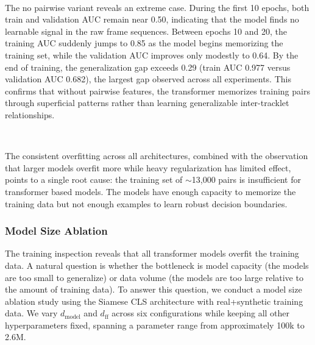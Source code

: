 \

The no pairwise variant reveals an extreme case. During the first 10 epochs, both train and validation AUC remain near 0.50, indicating that the model finds no learnable signal in the raw frame sequences. Between epochs 10 and 20, the training AUC suddenly jumps to 0.85 as the model begins memorizing the training set, while the validation AUC improves only modestly to 0.64. By the end of training, the generalization gap exceeds 0.29 (train AUC 0.977 versus validation AUC 0.682), the largest gap observed across all experiments. This confirms that without pairwise features, the transformer memorizes training pairs through superficial patterns rather than learning generalizable inter-tracklet relationships.

\

The consistent overfitting across all architectures, combined with the observation that larger models overfit more while heavy regularization has limited effect, points to a single root cause: the training set of $\sim$13{,}000 pairs is insufficient for transformer based models. The models have enough capacity to memorize the training data but not enough examples to learn robust decision boundaries.


\subsubsection{Model Size Ablation}\label{sec:size_ablation}
The training inspection reveals that all transformer models overfit the training data. A natural question is whether the bottleneck is model capacity (the models are too small to generalize) or data volume (the models are too large relative to the amount of training data). To answer this question, we conduct a model size ablation study using the Siamese CLS architecture with real+synthetic training data. We vary $d_{\text{model}}$ and $d_{\text{ff}}$ across six configurations while keeping all other hyperparameters fixed, spanning a parameter range from approximately 100k to 2.6M.

